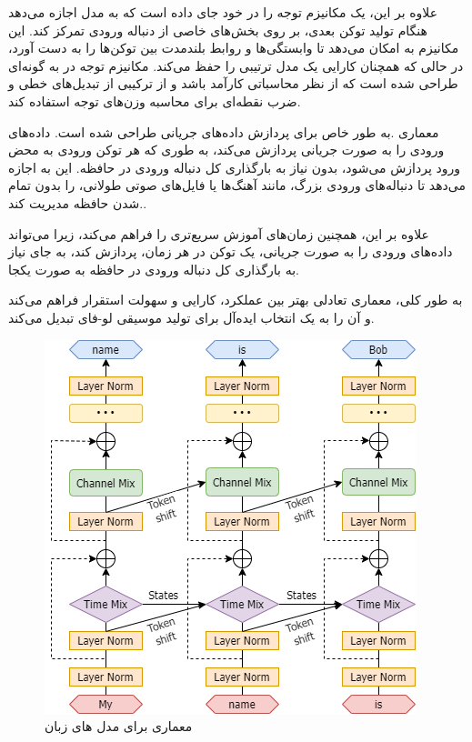 علاوه بر این،  یک مکانیزم توجه  را در خود جای داده است که به مدل اجازه می‌دهد هنگام تولید توکن بعدی، بر روی بخش‌های خاصی از دنباله ورودی تمرکز کند. این مکانیزم به  امکان می‌دهد تا وابستگی‌ها و روابط بلندمدت بین توکن‌ها را به دست آورد، در حالی که همچنان کارایی یک مدل ترتیبی را حفظ می‌کند. مکانیزم توجه در  به گونه‌ای طراحی شده است که از نظر محاسباتی کارآمد باشد و از ترکیبی از تبدیل‌های خطی و ضرب نقطه‌ای برای محاسبه وزن‌های توجه استفاده کند.

معماری  .به طور خاص برای پردازش داده‌های جریانی طراحی شده است.  داده‌های ورودی را به صورت جریانی پردازش می‌کند، به طوری که هر توکن ورودی به محض ورود پردازش می‌شود، بدون نیاز به بارگذاری کل دنباله ورودی در حافظه. این به  اجازه می‌دهد تا دنباله‌های ورودی بزرگ، مانند آهنگ‌ها یا فایل‌های صوتی طولانی، را بدون تمام شدن حافظه مدیریت کند..

علاوه بر این،  همچنین زمان‌های آموزش سریع‌تری را فراهم می‌کند، زیرا می‌تواند داده‌های ورودی را به صورت جریانی، یک توکن در هر زمان، پردازش کند، به جای نیاز به بارگذاری کل دنباله ورودی در حافظه به صورت یکجا.

به طور کلی، معماری  تعادلی بهتر بین عملکرد، کارایی و سهولت استقرار فراهم می‌کند و آن را به یک انتخاب ایده‌آل برای تولید موسیقی لو-فای تبدیل می‌کند.
\begin{figure}[!htb]
      \centering
      \includegraphics[scale=0.5]{Figures/RWKV-arch.png}
      \caption{معماری  برای مدل های زبان
      }
      \label{Fig:RWKV}
\end{figure}


